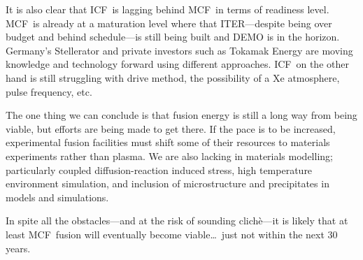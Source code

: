 \documentclass[12pt, a4paper]{article}
\newcommand{\mc}{MCF}
\newcommand{\ic}{ICF}
\newcommand{\ite}{ITER}
\begin{document}
		It is also clear that \ic~is lagging behind \mc~in terms of readiness level. \mc~is already at a maturation level where that \ite---despite being over budget and behind schedule---is still being built and DEMO is in the horizon. Germany's Stellerator and private investors such as Tokamak Energy are moving knowledge and technology forward using different approaches. \ic~on the other hand is still struggling with drive method, the possibility of a Xe atmosphere, pulse frequency, etc.
		
		The one thing we can conclude is that fusion energy is still a long way from being viable, but efforts are being made to get there. If the pace is to be increased, experimental fusion facilities must shift some of their resources to materials experiments rather than plasma. We are also lacking in materials modelling; particularly coupled diffusion-reaction induced stress, high temperature environment simulation, and inclusion of microstructure and precipitates in models and simulations.
		
		In spite all the obstacles---and at the risk of sounding clich\`{e}---it is likely that at least \mc~fusion will eventually become viable\ldots~just not within the next 30 years.
	
	
\end{document}
